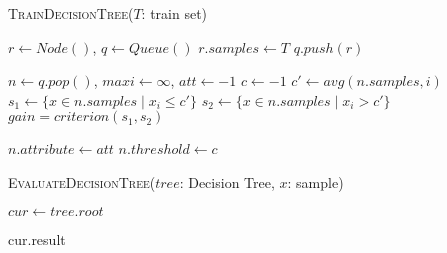 \begin{minipage}{0.92\textwidth}
    \begin{algorithm}[H]
        \caption{\textsc{TrainDecisionTree}($T$: train set)}\label{algo:train-decision-tree}
        $r \gets Node()$, $q \gets Queue()$\;
        $r.samples \gets T$\;
        $q.push(r)$\;
         {
            $n \gets q.pop()$, $maxi \gets \infty$, $att \gets -1$\;
            $c \gets -1$\;
             {
                $c' \gets avg(n.samples, i)$\;
                $s_1 \gets \{x \in n.samples \mid x_i \leq c'\}$\;
                $s_2 \gets \{x \in n.samples \mid x_i > c'\}$\;
                $gain = criterion(s_1, s_2)$\;
            }

            $n.attribute \gets att$\;
            $n.threshold \gets c$\;
            
        }
    \end{algorithm}
\end{minipage}

\begin{minipage}{0.92\textwidth}
    \begin{algorithm}[H]
        \caption{\textsc{EvaluateDecisionTree}($tree$: Decision Tree, $x$: sample)}\label{algo:test-decision-tree}
        $cur \gets tree.root$\;
         {
             
        }

        \KwReturn cur.result\;
    \end{algorithm}
\end{minipage}


